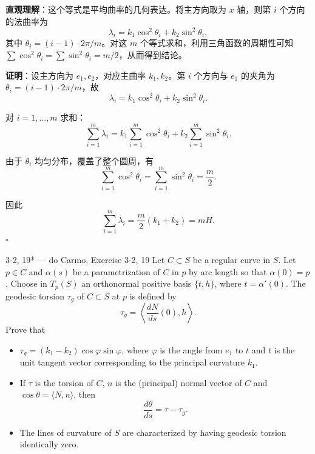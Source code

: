 \begin{solution}
\textbf{直观理解}：这个等式是平均曲率的几何表达。将主方向取为 $x$ 轴，则第 $i$ 个方向的法曲率为
\[
\lambda_i = k_1 \cos^2\theta_i + k_2 \sin^2\theta_i,
\]
其中 $\theta_i = (i-1) \cdot 2\pi/m$。对这 $m$ 个等式求和，利用三角函数的周期性可知 $\sum \cos^2\theta_i = \sum \sin^2\theta_i = m/2$，从而得到结论。

\textbf{证明}：设主方向为 $e_1, e_2$，对应主曲率 $k_1, k_2$。第 $i$ 个方向与 $e_1$ 的夹角为 $\theta_i = (i-1) \cdot 2\pi/m$，故
\[
\lambda_i = k_1 \cos^2\theta_i + k_2 \sin^2\theta_i.
\]

对 $i = 1, \ldots, m$ 求和：
\[
\sum_{i=1}^m \lambda_i = k_1 \sum_{i=1}^m \cos^2\theta_i + k_2 \sum_{i=1}^m \sin^2\theta_i.
\]

由于 $\theta_i$ 均匀分布，覆盖了整个圆周，有
\[
\sum_{i=1}^m \cos^2\theta_i = \sum_{i=1}^m \sin^2\theta_i = \frac{m}{2}.
\]

因此
\[
\sum_{i=1}^m \lambda_i = \frac{m}{2}(k_1 + k_2) = m H.
\]
$\square$
\end{solution}

\begin{exercise}{3-2, 19* — do Carmo, Exercise 3-2, 19}
Let $C \subset S$ be a regular curve in $S$. Let $p \in C$ and $\alpha(s)$ be a parametrization of $C$ in $p$ by arc length so that $\alpha(0) = p$. Choose in $T_p(S)$ an orthonormal positive basis $\{t, h\}$, where $t = \alpha'(0)$. The geodesic torsion $\tau_g$ of $C \subset S$ at $p$ is defined by
\[
\tau_ {g} = \left\langle \frac {d N}{d s} (0), h \right\rangle.
\]
Prove that
\begin{itemize}
\item[a.] $\tau_{g} = (k_{1} - k_{2})\cos \varphi \sin \varphi$, where $\varphi$ is the angle from $e_1$ to $t$ and $t$ is the unit tangent vector corresponding to the principal curvature $k_{1}$.
\item[b.] If $\tau$ is the torsion of $C$, $n$ is the (principal) normal vector of $C$ and $\cos \theta = \langle N, n \rangle$, then
\[
\frac {d \theta}{d s} = \tau - \tau_ {g}.
\]
\item[c.] The lines of curvature of $S$ are characterized by having geodesic torsion identically zero.
\end{itemize}
\end{exercise}

